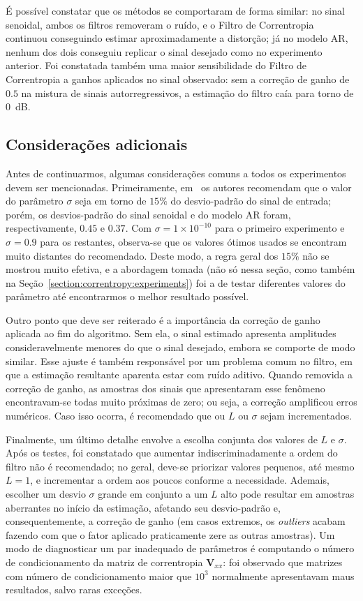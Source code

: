É possível constatar que os métodos se comportaram de forma similar: no sinal senoidal, ambos os filtros removeram o ruído, e o Filtro de Correntropia continuou conseguindo estimar aproximadamente a distorção; já no modelo AR, nenhum dos dois conseguiu replicar o sinal desejado como no experimento anterior. Foi constatada também uma maior sensibilidade do Filtro de Correntropia a ganhos aplicados no sinal observado: sem a correção de ganho de $0.5$ na mistura de sinais autorregressivos, a estimação do filtro caía para torno de $0$~dB.

\subsection{Considerações adicionais}
\label{subsec:correntropy:considerations}

Antes de continuarmos, algumas considerações comuns a todos os experimentos devem ser mencionadas. Primeiramente, em~\cite{pokharel-2006} os autores recomendam que o valor do parâmetro $\sigma$ seja em torno de $15\%$ do desvio-padrão do sinal de entrada; porém, os desvios-padrão do sinal senoidal e do modelo AR foram, respectivamente, $0.45$ e $0.37$. Com $\sigma = 1 \times 10^{-10}$ para o primeiro experimento e $\sigma = 0.9$ para os restantes, observa-se que os valores ótimos usados se encontram muito distantes do recomendado. Deste modo, a regra geral dos $15\%$ não se mostrou muito efetiva, e a abordagem tomada (não só nessa seção, como também na Seção~\ref{section:correntropy:experiments}) foi a de testar diferentes valores do parâmetro até encontrarmos o melhor resultado possível.

Outro ponto que deve ser reiterado é a importância da correção de ganho aplicada ao fim do algoritmo. Sem ela, o sinal estimado apresenta amplitudes consideravelmente menores do que o sinal desejado, embora se comporte de modo similar. Esse ajuste é também responsável por um problema comum no filtro, em que a estimação resultante aparenta estar com ruído aditivo. Quando removida a correção de ganho, as amostras dos sinais que apresentaram esse fenômeno encontravam-se todas muito próximas de zero; ou seja, a correção amplificou erros numéricos. Caso isso ocorra, é recomendado que ou $L$ ou $\sigma$ sejam incrementados.

Finalmente, um último detalhe envolve a escolha conjunta dos valores de $L$ e $\sigma$. Após os testes, foi constatado que aumentar indiscriminadamente a ordem do filtro não é recomendado; no geral, deve-se priorizar valores pequenos, até mesmo $L = 1$, e incrementar a ordem aos poucos conforme a necessidade. Ademais, escolher um desvio $\sigma$ grande em conjunto a um $L$ alto pode resultar em amostras aberrantes no início da estimação, afetando seu desvio-padrão e, consequentemente, a correção de ganho (em casos extremos, os \textit{outliers} acabam fazendo com que o fator aplicado praticamente zere as outras amostras). Um modo de diagnosticar um par inadequado de parâmetros é computando o número de condicionamento da matriz de correntropia $\mathbf{V}_{xx}$: foi observado que matrizes com número de condicionamento maior que $10^3$ normalmente apresentavam maus resultados, salvo raras exceções.

